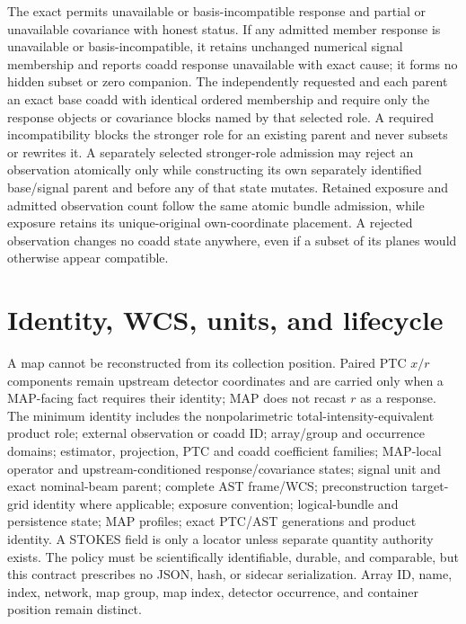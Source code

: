 \documentclass[10pt]{article}
\begin{document}
The exact \SCIMapBaseCoaddRole{} permits unavailable or basis-incompatible
response and partial or unavailable covariance with honest status. If any
admitted member response is unavailable or basis-incompatible, it retains
unchanged numerical signal membership and reports coadd response unavailable
with exact cause; it forms no hidden subset or zero companion. The
independently requested \SCIMapResponseCoaddRole{} and
\SCIMapCovarianceCoaddRole{} each parent an exact base coadd with identical
ordered membership and require only the response objects or covariance blocks
named by that selected role. A required incompatibility blocks the stronger
role for an existing parent and never subsets or rewrites it. A separately
selected stronger-role admission may reject an observation atomically only
while constructing its own separately identified base/signal parent and before
any of that state mutates. Retained exposure and admitted
observation count follow the same atomic bundle admission, while exposure
retains its unique-original own-coordinate placement.
A rejected observation changes no
coadd state anywhere, even if a subset of its planes would otherwise appear
compatible.

\clearpage
\section{Identity, WCS, units, and lifecycle}

A map cannot be reconstructed from its collection position. Paired PTC
\(x/r\) components remain upstream detector coordinates and are carried only
when a MAP-facing fact requires their identity; MAP does not recast \(r\) as a
response. The minimum
identity includes the nonpolarimetric total-intensity-equivalent product role;
external observation or coadd ID; array/group and occurrence domains;
estimator, projection, PTC and coadd coefficient families; MAP-local operator
and upstream-conditioned response/covariance states; signal unit and exact
nominal-beam parent; complete AST frame/WCS; preconstruction target-grid
identity where applicable; exposure convention; logical-bundle and persistence
state; MAP profiles; exact PTC/AST generations and product identity. A STOKES
field is only a locator unless separate quantity authority exists. The policy must
be scientifically identifiable, durable, and comparable, but this contract
prescribes no JSON, hash, or sidecar serialization. Array ID, name, index,
network, map group, map index,
detector occurrence, and container position remain distinct.
\end{document}

